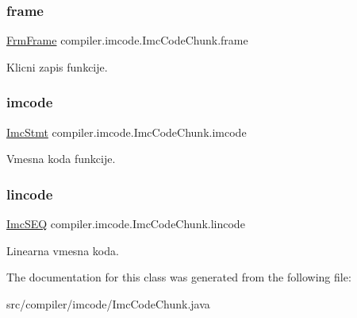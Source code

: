 \subsubsection{\texorpdfstring{frame}{frame}}
{\footnotesize\ttfamily \hyperlink{classcompiler_1_1frames_1_1_frm_frame}{Frm\+Frame} compiler.\+imcode.\+Imc\+Code\+Chunk.\+frame}

Klicni zapis funkcije. \mbox{\label{classcompiler_1_1imcode_1_1_imc_code_chunk_a1e1578acaa5c36be5926b3c4391b7b98}} 
\subsubsection{\texorpdfstring{imcode}{imcode}}
{\footnotesize\ttfamily \hyperlink{classcompiler_1_1imcode_1_1_imc_stmt}{Imc\+Stmt} compiler.\+imcode.\+Imc\+Code\+Chunk.\+imcode}

Vmesna koda funkcije. \mbox{\label{classcompiler_1_1imcode_1_1_imc_code_chunk_ad5ec7a53e668d5a7dc3b79a979c748f5}} 
\subsubsection{\texorpdfstring{lincode}{lincode}}
{\footnotesize\ttfamily \hyperlink{classcompiler_1_1imcode_1_1_imc_s_e_q}{Imc\+S\+EQ} compiler.\+imcode.\+Imc\+Code\+Chunk.\+lincode}

Linearna vmesna koda. 

The documentation for this class was generated from the following file\+:\begin{DoxyCompactItemize}
\item 
src/compiler/imcode/Imc\+Code\+Chunk.\+java\end{DoxyCompactItemize}
